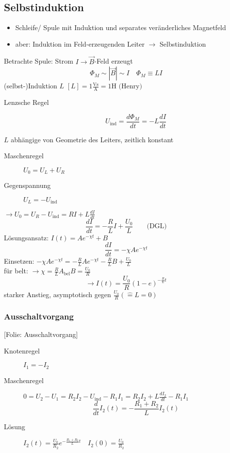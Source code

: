 \documentclass[titlepage,12pt,a4paper,ngerman]{report}
\newcommand{\tx}[1]{\textrm{#1}}
\newcommand{\uind}{U_{\tx{ind}}}
\newcommand{\folie}[1]{\color{gray}[Folie: #1]\color{black}}
\begin{document}

\subsection{Selbstinduktion}
\begin{itemize}
	\item Schleife/ Spule mit Induktion und separates veränderliches Magnetfeld
	\item aber: Induktion im Feld-erzeugenden Leiter $\rightarrow$ Selbstinduktion
\end{itemize}
Betrachte Spule: Strom $I \rightarrow \vec{B}$-Feld erzeugt
$$\Phi_M \sim |\vec{B}| \sim I \quad \boxed{\Phi_M \equiv LI}$$
(selbst-)Induktion $L$ $[L] = 1\frac{\tx{Vs}}{\tx{A}} = 1 \tx{H (Henry)}$
\begin{description}
	\item [Lenzsche Regel] $$\boxed{U_{\tx{ind}} = \frac{d \Phi_M}{dt} = - L \frac{dI}{dt}}$$
\end{description}
$L$ abhängige von Geometrie des Leiters, zeitlich konstant
\begin{description}
	\item [Maschenregel] $U_0 = U_L + U_R$
	\item [Gegenspannung] $U_L = - \uind $
\end{description}
$\rightarrow U_0 = U_R - \uind = RI + L \frac{dI}{dt}$
$$\frac{dI}{dt}= - \frac{R}{L} I + \frac{U_0}{L} \qquad \tx{(DGL)}$$
Lösungsansatz: $I(t) = Ae^{-\chi t} + B$
$$\frac{dI}{dt} = -\chi Ae^{-\chi t}$$
Einsetzen: $- \chi A e^{-\chi t} = - \frac{R}{L} A e^{-\chi t} - \frac{R}{L}B + \frac{U_0}{L}$\\
für belt: $\rightarrow \chi = \frac{R}{L} A_{\tx{bel}} B = \frac{U_0}{R}$
$$\rightarrow I(t) = \frac{U_0}{R} (1-e)^{-\frac{R}{L} t}$$
starker Anstieg, asymptotisch gegen $\frac{U_0}{R} (\hat{=} L = 0)$

\subsubsection{Ausschaltvorgang}
\folie{Ausschaltvorgang}
\begin{description}
	\item [Knotenregel] $I_1 = -I_2$
	\item [Maschenregel] $0 = U_2 - U_1 = R_2 I_2 - \uind - R_1 I_1 = R_2 I_2 + L \frac{dI_2}{dt} - R_1 I_1$
	$$\frac{d}{dt} I_2 (t) = - \frac{R_1 + R_2}{L} I_2 (t)$$
	\item [Lösung] $I_2 (t) = \frac{U_0}{R_2} e^{-\frac{R_1 +R_2}{L} t} \quad I_2(0) = \frac{U_0}{R_2}$
\end{description}
\end{document}
